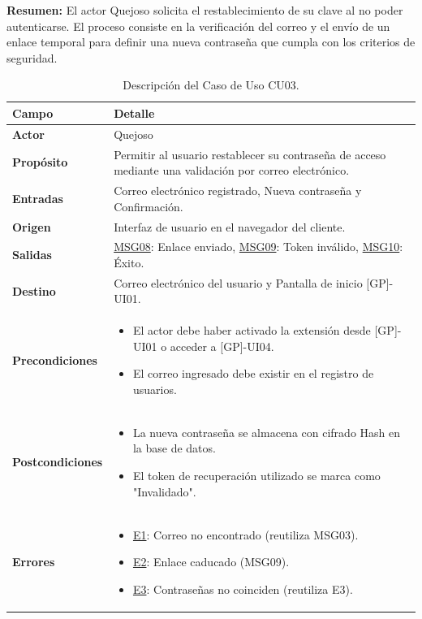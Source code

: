 \begin{appendices}
\textbf{Resumen:} 
El actor Quejoso solicita el restablecimiento de su clave al no poder autenticarse. El proceso consiste en la verificación del correo y el envío de un enlace temporal para definir una nueva contraseña que cumpla con los criterios de seguridad.

\begin{table}[htbp]
\centering
\small
\begin{tabular}{|p{3.5cm}|p{10.5cm}|}
\hline
\rowcolor[HTML]{EFEFEF} 
\textbf{Campo} & \textbf{Detalle} \\ \hline
\textbf{Actor} & Quejoso \\ \hline
\textbf{Propósito} & Permitir al usuario restablecer su contraseña de acceso mediante una validación por correo electrónico. \\ \hline
\textbf{Entradas} & Correo electrónico registrado, Nueva contraseña y Confirmación. \\ \hline
\textbf{Origen} & Interfaz de usuario en el navegador del cliente. \\ \hline
\textbf{Salidas} & \hyperlink{msg:MSG08}{MSG08}: Enlace enviado, \hyperlink{msg:MSG09}{MSG09}: Token inválido, \hyperlink{msg:MSG10}{MSG10}: Éxito. \\ \hline
\textbf{Destino} & Correo electrónico del usuario y Pantalla de inicio [GP]-UI01. \\ \hline
\textbf{Precondiciones} & 
\begin{itemize}[nosep, leftmargin=*]
    \item El actor debe haber activado la extensión desde [GP]-UI01 o acceder a [GP]-UI04.
    \item El correo ingresado debe existir en el registro de usuarios.
\end{itemize} \\ \hline
\textbf{Postcondiciones} & 
\begin{itemize}[nosep, leftmargin=*]
    \item La nueva contraseña se almacena con cifrado Hash en la base de datos.
    \item El token de recuperación utilizado se marca como "Invalidado".
\end{itemize} \\ \hline
\textbf{Errores} & 
\begin{itemize}[nosep, leftmargin=*]
    \item \hyperlink{msg:MSG03}{E1}: Correo no encontrado (reutiliza MSG03).
    \item \hyperlink{err:E6}{E2}: Enlace caducado (MSG09).
    \item \hyperlink{err:E3}{E3}: Contraseñas no coinciden (reutiliza E3).
\end{itemize} \\ \hline
\end{tabular}
\caption{Descripción del Caso de Uso CU03.}
\label{tab:cu03_especificacion}
\end{table}


\end{appendices}
